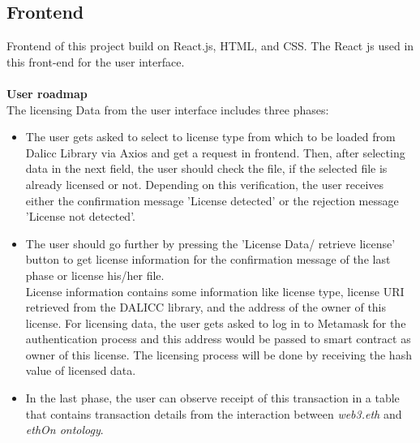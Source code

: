 \subsection{Frontend}
 Frontend of this project build on React.js, HTML, and CSS. The React js used in this front-end for the user interface.\\
 \\
 \textbf{User roadmap}\\
 The licensing Data from the user interface includes three phases:
 \begin{itemize}
 	\item The user gets asked to select to license type from which to be loaded from Dalicc Library via Axios and get a request in frontend. Then, after selecting data in the next field, the user should check the file, if the selected file is already licensed or not. Depending on this verification, the user receives either the confirmation message 'License detected' or the rejection message 'License not detected'. 
 	\item The user should go further by pressing the 'License Data/ retrieve license' button to get license information for the confirmation message of the last phase or license his/her file.\\
 License information contains some information like license type, license URI retrieved from the DALICC library, and the address of the owner of this license. For licensing data, the user gets asked to log in to Metamask for the authentication process and this address would be passed to smart contract as owner of this license. The licensing process will be done by receiving the hash value of licensed data.
 	\item In the last phase, the user can observe receipt of this transaction in a table that contains transaction details from the interaction between \textit{web3.eth} and \textit{ethOn ontology}.
 \end{itemize}
